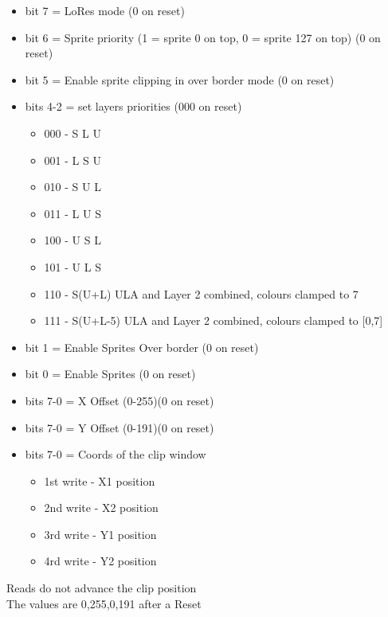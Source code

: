 \begin{itemize}
\item bit 7 = LoRes mode (0 on reset)
\item bit 6 = Sprite priority (1 = sprite 0 on top, 0 = sprite 127 on
  top) (0 on reset)
\item bit 5 = Enable sprite clipping in over border mode (0 on reset)
\item bits 4-2 = set layers priorities (000 on reset)
  \begin{itemize}
  \item 000 - S L U
  \item 001 - L S U
  \item 010 - S U L
  \item 011 - L U S
  \item 100 - U S L
  \item 101 - U L S
  \item 110 - S(U+L) ULA and Layer 2 combined, colours clamped to 7
  \item 111 - S(U+L-5) ULA and Layer 2 combined, colours clamped to [0,7]
  \end{itemize}
\item bit 1 = Enable Sprites Over border (0 on reset)
\item bit 0 = Enable Sprites (0 on reset)
\end{itemize}

\begin{itemize}
\item bits 7-0 = X Offset (0-255)(0 on reset)
\end{itemize}

\begin{itemize}
\item bits 7-0 = Y Offset (0-191)(0 on reset)
\end{itemize}

\begin{itemize}
\item bits 7-0 = Coords of the clip window
  \begin{itemize}
  \item[] 1st write - X1 position
  \item[] 2nd write - X2 position
  \item[] 3rd write - Y1 position
  \item[] 4rd write - Y2 position
  \end{itemize}
\end{itemize}
Reads do not advance the clip position\\
The values are 0,255,0,191 after a Reset

